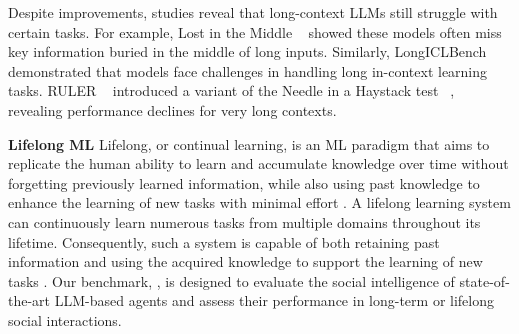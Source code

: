 Despite improvements, studies reveal that long-context LLMs still struggle with certain tasks. For example, Lost in the Middle ~\citep{liu2024lost} showed these models often miss key information buried in the middle of long inputs. Similarly, LongICLBench ~\citep{li2024longcontextllmsstrugglelong} demonstrated that models face challenges in handling long in-context learning tasks. RULER ~\citep{hsieh2024rulerwhatsrealcontext} introduced a variant of the Needle in a Haystack test ~\citep{gka23}, revealing performance declines for very long contexts.

\textbf{Lifelong ML} \quad Lifelong, or continual learning, is an ML paradigm that aims to replicate the human ability to learn and accumulate knowledge over time without forgetting previously learned information, while also using past knowledge to enhance the learning of new tasks with minimal effort \citep{ke2023continuallearningnaturallanguage}. A lifelong learning system can continuously learn numerous tasks from multiple domains throughout its lifetime. Consequently, such a system is capable of both retaining past information and using the acquired knowledge to support the learning of new tasks \citep{chen2018lifelong}. Our benchmark, \lifelongsotopia, is designed to evaluate the social intelligence of state-of-the-art LLM-based agents and assess their performance in long-term or lifelong social interactions.